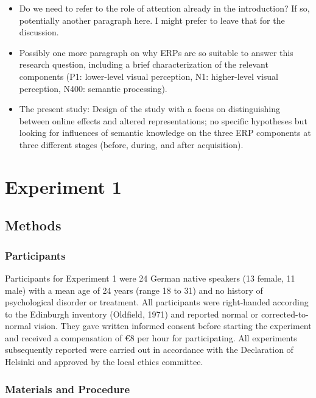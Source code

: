 \documentclass[
  english,
  man,11pt,floatsintext]{apa7}
\begin{document}
\begin{itemize}
\item
  Do we need to refer to the role of attention already in the introduction? If so, potentially another paragraph here. I might prefer to leave that for the discussion.
\item
  Possibly one more paragraph on why ERPs are so suitable to answer this research question, including a brief characterization of the relevant components (P1: lower-level visual perception, N1: higher-level visual perception, N400: semantic processing).
\item
  The present study: Design of the study with a focus on distinguishing between online effects and altered representations; no specific hypotheses but looking for influences of semantic knowledge on the three ERP components at three different stages (before, during, and after acquisition).
\end{itemize}

\hypertarget{experiment-1}{%
\section{Experiment 1}\label{experiment-1}}

\hypertarget{methods}{%
\subsection{Methods}\label{methods}}

\hypertarget{participants}{%
\subsubsection{Participants}\label{participants}}

Participants for Experiment 1 were 24 German native speakers (13 female, 11 male) with a mean age of 24 years (range 18 to 31) and no history of psychological disorder or treatment. All participants were right-handed according to the Edinburgh inventory (Oldfield, 1971) and reported normal or corrected-to-normal vision. They gave written informed consent before starting the experiment and received a compensation of €8 per hour for participating. All experiments subsequently reported were carried out in accordance with the Declaration of Helsinki and approved by the local ethics committee.

\hypertarget{materials-and-procedure}{%
\subsubsection{Materials and Procedure}\label{materials-and-procedure}}
\end{document}
